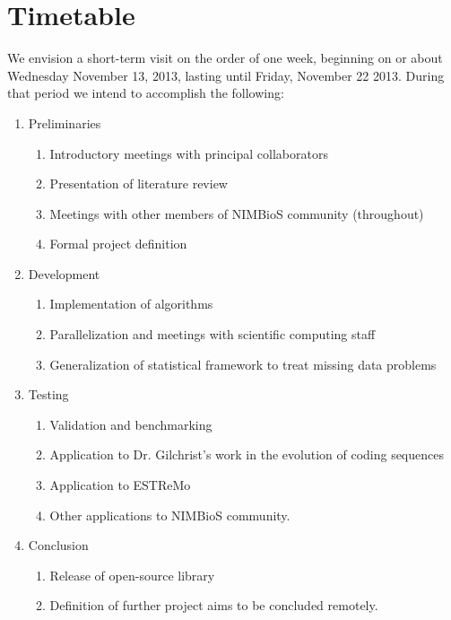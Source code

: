\documentclass{article}
\begin{document}
\section{Timetable}

We envision a short-term visit on the order of one week, beginning on
or about Wednesday November 13, 2013, lasting until Friday, November
22 2013.  During that period we intend to accomplish the following:
\begin{enumerate}
\item Preliminaries
  \begin{enumerate}
  \item Introductory meetings with principal collaborators
  \item Presentation of literature review
  \item Meetings with other members of NIMBioS community (throughout)
  \item Formal project definition
  \end{enumerate}
\item Development
  \begin{enumerate}
  \item Implementation of algorithms
  \item Parallelization and meetings with scientific computing staff
  \item Generalization of statistical framework to treat missing data problems
  \end{enumerate}
\item Testing
  \begin{enumerate}
  \item Validation and benchmarking
  \item Application to Dr. Gilchrist's work in the evolution of coding sequences
  \item Application to ESTReMo
  \item Other applications to NIMBioS community.
  \end{enumerate}
\item Conclusion
  \begin{enumerate}
  \item Release of open-source library
  \item Definition of further project aims to be concluded remotely.
  \end{enumerate}
\end{enumerate}
\end{document}

